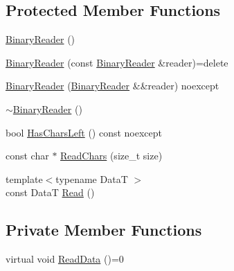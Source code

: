 \subsection*{Protected Member Functions}
\begin{DoxyCompactItemize}
\item 
\hyperlink{classmage_1_1_binary_reader_aab82579cef4f2f022273cf1adfcc8497}{Binary\+Reader} ()
\item 
\hyperlink{classmage_1_1_binary_reader_a8c1ff948f1d056439f3d8cc37d7f507c}{Binary\+Reader} (const \hyperlink{classmage_1_1_binary_reader}{Binary\+Reader} \&reader)=delete
\item 
\hyperlink{classmage_1_1_binary_reader_a520841747b74b4b0e95f8d9b595492fa}{Binary\+Reader} (\hyperlink{classmage_1_1_binary_reader}{Binary\+Reader} \&\&reader) noexcept
\item 
\hyperlink{classmage_1_1_binary_reader_a42e6c31bc53f5214675f845756b5a404}{$\sim$\+Binary\+Reader} ()
\item 
bool \hyperlink{classmage_1_1_binary_reader_aec91fece03b619c158b133beb1bc9381}{Has\+Chars\+Left} () const noexcept
\item 
const char $\ast$ \hyperlink{classmage_1_1_binary_reader_af1e0e4ab815e23c72ab65fd7c0748d3f}{Read\+Chars} (size\+\_\+t size)
\item 
{\footnotesize template$<$typename DataT $>$ }\\const DataT \hyperlink{classmage_1_1_binary_reader_ad914ec3edfef7a9e9976ef706be44b92}{Read} ()
\end{DoxyCompactItemize}
\subsection*{Private Member Functions}
\begin{DoxyCompactItemize}
\item 
virtual void \hyperlink{classmage_1_1_binary_reader_a67157828a9781644fb55bd7f3558f07c}{Read\+Data} ()=0
\end{DoxyCompactItemize}
